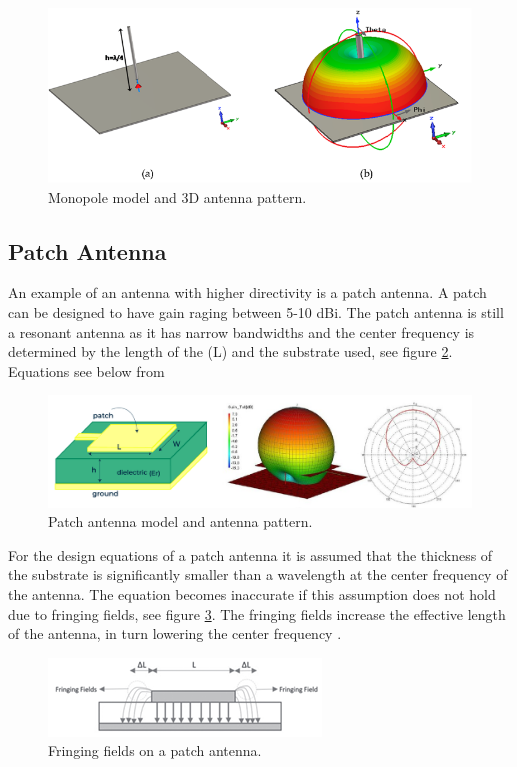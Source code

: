     \begin{figure}[H]
    \centering
    \includegraphics[width=0.6\linewidth]{Figures/chp2_monopole.png}
    \caption{Monopole model and 3D antenna pattern.}
    \label{fig:chp2_monopole}
    \end{figure}

\subsection{Patch Antenna}
An example of an antenna with higher directivity is a patch antenna. A patch can be designed to have gain raging between 5-10 dBi. The patch antenna is still a resonant antenna as it has narrow bandwidths and the center frequency is determined by the length of the (L) and the substrate used, see figure \ref{fig:chp2_patch}. Equations see below from \cite{patchDimensions}

    \begin{figure}[H]
    \centering
    \includegraphics[width=0.8\linewidth]{Figures/chp2_patch.png}
    \caption{Patch antenna model and antenna pattern.}
    \label{fig:chp2_patch}
    \end{figure}

For the design equations of a patch antenna it is assumed that the thickness of the substrate is significantly smaller than a wavelength at the center frequency of the antenna. The equation becomes inaccurate if this assumption does not hold due to fringing fields, see figure \ref{fig:chp2_fringing_fields}. The fringing fields increase the effective length of the antenna, in turn lowering the center frequency \cite{Fringing}.

    \begin{figure}[H]
    \centering
    \includegraphics[width=0.5\linewidth]{Figures/chp2_fringing_fields.png}
    \caption{Fringing fields on a patch antenna.}
    \label{fig:chp2_fringing_fields}
    \end{figure}

